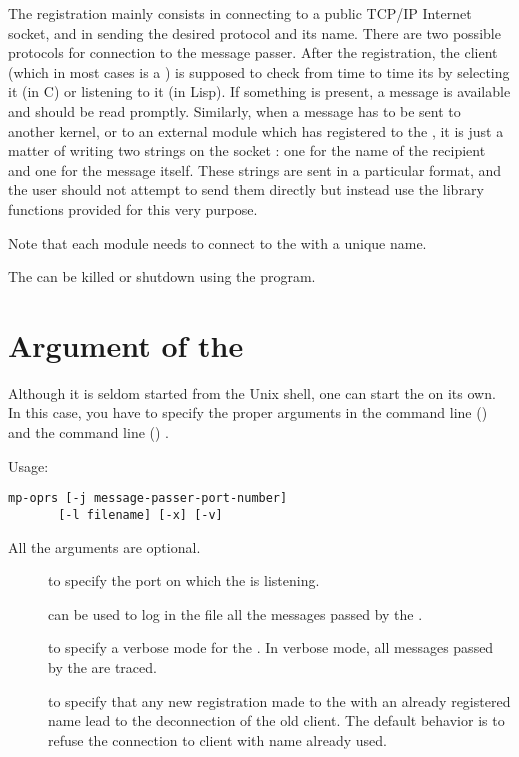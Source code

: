 The registration mainly consists in connecting to a public TCP/IP Internet
socket, and in sending the desired protocol and its name. There are two
possible protocols for connection to the message passer. After the
registration, the client (which in most cases is a \CPK{}) is supposed to check
from time to time its  by selecting it (in C) or listening to
it (in Lisp).  If something is present, a message is available and should be
read promptly.  Similarly, when a message has to be sent to another \COPRS{}
kernel, or to an external module which has registered to the \MPA{}, it is just
a matter of writing two strings on the socket : one for the
name of the recipient and one for the message itself. These strings are sent in
a particular format, and the user should not attempt to send them directly but
instead use the library functions provided for this very purpose.

Note that each module needs to connect to the \MPA{} with a unique name.

The \MPA{} can be killed or shutdown using the  program. 



\section{Argument of the \MPA{}}


Although it is seldom started from the Unix shell, one can start the \MPA{} on
its own. In this case, you have to specify the proper arguments in the
\OPRSS{} command line () and the \OPRS{}
command line () .

Usage: \begin{verbatim}
mp-oprs [-j message-passer-port-number]
       [-l filename] [-x] [-v] 
\end{verbatim}


All the arguments are optional.

\begin{description}

\item[] to specify the port on which the \MPA{} is listening.

\item[] can be used to log in the file  all
the messages passed by the \MPA{}.

\item[] to specify a verbose mode for the \MPA{}. In verbose mode, all
messages passed by the \MPA{} are traced.

\item[] to specify that any new registration made to the \MPA{} with an
already registered name lead to the deconnection of the old client. The default
behavior is to refuse the connection to client with name already used.

\end{description}

